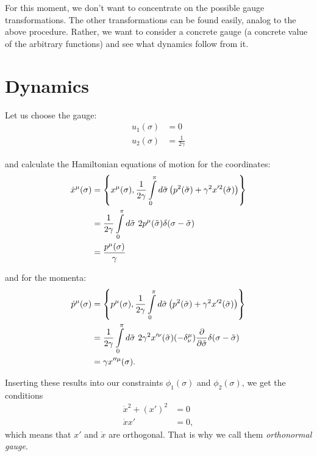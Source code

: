 For this moment, we don't want to concentrate on the possible gauge transformations. The other transformations can be found easily, analog to the above procedure. Rather, we want to consider a concrete gauge (a concrete value of the arbitrary functions) and see what dynamics follow from it. 


\section{Dynamics}

Let us choose the gauge:
\begin{align}
u_1(\sigma) &= 0 \\
u_2(\sigma) &= \frac{1}{2 \gamma} 
\end{align}

and calculate the Hamiltonian equations of motion for the coordinates:
\begin{align}\label{eq:78}
\dot{x}^{\mu}(\sigma) &= \left \{ x^{\mu}(\sigma), \frac{1}{2 \gamma} \displaystyle\int\limits_{0}^{\pi} d\tilde{\sigma} \left( p^2(\tilde{\sigma}) + \gamma^2 x'^2(\tilde{\sigma}) \right) \right \} \notag \\
&= \frac{1}{2 \gamma} \displaystyle\int\limits_{0}^{\pi} d\tilde{\sigma} \ 2 p^{\mu}(\tilde{\sigma}) \delta(\sigma - \tilde{\sigma}) \notag \\
&= \frac{p^{\mu}(\sigma)}{\gamma}
\end{align}

and for the momenta:
\begin{align}\label{eq:79}
\dot{p}^{\mu}(\sigma) &= \left \{ p^{\mu}(\sigma), \frac{1}{2 \gamma} \displaystyle\int\limits_{0}^{\pi} d\tilde{\sigma} \left( p^2(\tilde{\sigma}) + \gamma^2 x'^2(\tilde{\sigma}) \right) \right \} \notag \\
&= \frac{1}{2 \gamma} \displaystyle\int\limits_{0}^{\pi} d\tilde{\sigma} \ 2 \gamma^2 x'^{\nu}(\tilde{\sigma}) (- \delta^{\mu}_{\nu}) \frac{\partial}{\partial \tilde{\sigma}}\delta(\sigma - \tilde{\sigma}) \notag \\
&= \gamma x''^{\mu}(\sigma).
\end{align}

Inserting these results into our constraints $\phi_1(\sigma)$ and $\phi_2(\sigma)$, we get the conditions
\begin{align}
\dot{x}^2 + (x')^2 &= 0 \\
\dot{x} x' &= 0,
\end{align}
which means that $x'$ and $\dot{x}$ are orthogonal. That is why we call them \textit{orthonormal gauge}.

